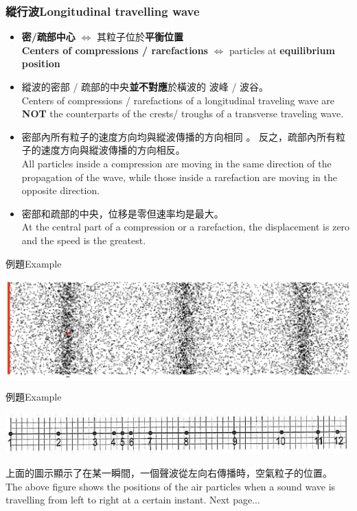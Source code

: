 \documentclass[beamer=true]{standalone}
\begin{document}
\begin{frame}
    \frametitle{縱行波Longitudinal travelling wave}

    \begin{itemize}
        \item \textbf{密/疏部中心} $\Leftrightarrow$ 其粒子位於\textbf{平衡位置}\\\textbf{Centers of compressions / rarefactions} $\Leftrightarrow$  particles at \textbf{equilibrium position}
        \item 縱波的密部 / 疏部的中央\textbf{並不對應}於橫波的 波峰 / 波谷。\\Centers of compressions / rarefactions of a longitudinal traveling wave are \textbf{NOT} the counterparts of the crests/ troughs of a transverse traveling wave.
        \item 密部內所有粒子的速度方向均與縱波傳播的方向相同 。 反之，疏部內所有粒子的速度方向與縱波傳播的方向相反。\\All particles inside a compression are moving in the same direction of the propagation of the wave, while those inside a rarefaction are moving in the opposite direction.
        \item 密部和疏部的中央，位移是零但速率均是最大。\\At the central part of a compression or a rarefaction, the displacement is zero and the speed is the greatest.
    \end{itemize}
\end{frame}

\begin{frame}[t]{例題Example}
    \par{\par\centering\includegraphics[width=\textwidth]{./img/ch1b_2024-05-17-12-16-45.png}\par}
\end{frame}

\begin{frame}[t]{例題Example}
    \par{\par\centering\includegraphics[width=\textwidth]{./img/ch1b_2024-05-17-12-41-10.png}\par}
    上面的圖示顯示了在某一瞬間，一個聲波從左向右傳播時，空氣粒子的位置。\\The above figure shows the positions of the air particles when a sound wave is travelling from left to right at a certain instant.
    \vfill\raggedleft Next page...
\end{frame}
\end{document}
